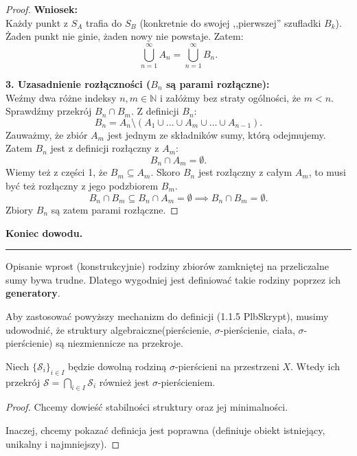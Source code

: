 \begin{proof}
    \noindent\textbf{Wniosek:} \\
    Każdy punkt z $S_A$ trafia do $S_B$ (konkretnie do swojej ,,pierwszej'' szufladki $B_k$). Żaden punkt nie ginie, żaden nowy nie powstaje. Zatem:
    \[
        \bigcup_{n=1}^{\infty} A_n = \bigcup_{n=1}^{\infty} B_n.
    \]

    \noindent\textbf{3. Uzasadnienie rozłączności ($B_n$ są parami rozłączne):} \\
    Weźmy dwa różne indeksy $n, m \in \mathbb{N}$ i załóżmy bez straty ogólności, że $m < n$.
    Sprawdźmy przekrój $B_n \cap B_m$.
    Z definicji $B_n$:
    \[
        B_n = A_n \setminus \left( A_1 \cup \dots \cup A_m \cup \dots \cup A_{n-1} \right).
    \]
    Zauważmy, że zbiór $A_m$ jest jednym ze składników sumy, którą odejmujemy. Zatem $B_n$ jest z definicji rozłączny z $A_m$:
    \[
        B_n \cap A_m = \emptyset.
    \]
    Wiemy też z części 1, że $B_m \subseteq A_m$. Skoro $B_n$ jest rozłączny z całym $A_m$, to musi być też rozłączny z jego podzbiorem $B_m$.
    \[
        B_n \cap B_m \subseteq B_n \cap A_m = \emptyset \implies B_n \cap B_m = \emptyset.
    \]
    Zbiory $B_n$ są zatem parami rozłączne.
\end{proof} 
\vspace{1em}

\noindent \textbf{Koniec dowodu.}

\vspace{1em}

\hrule

\vspace{1em}

\noindent Opisanie wprost (konstrukcyjnie) rodziny zbiorów zamkniętej na przeliczalne sumy bywa trudne. Dlatego wygodniej jest definiować takie rodziny poprzez ich \textbf{generatory}.

Aby zastosować powyższy mechanizm do definicji (1.1.5 PlbSkrypt), musimy udowodnić, że struktury algebraiczne(pierścienie, $\sigma$-pierścienie, ciała, $\sigma$-pierścienie) są niezmiennicze na przekroje.

\begin{theorem}
    Niech $\{\mathcal{S}_i\}_{i \in I}$ będzie dowolną rodziną $\sigma$-pierścieni na przestrzeni $X$. Wtedy ich przekrój $\mathcal{S} = \bigcap_{i \in I} \mathcal{S}_i$ również jest $\sigma$-pierścieniem.
\end{theorem}

\begin{proof}
	Chcemy dowieść stabilności struktury oraz jej minimalności.

	Inaczej, chcemy pokazać definicja jest poprawna (definiuje obiekt istniejący, unikalny i najmniejszy).
\end{proof}

